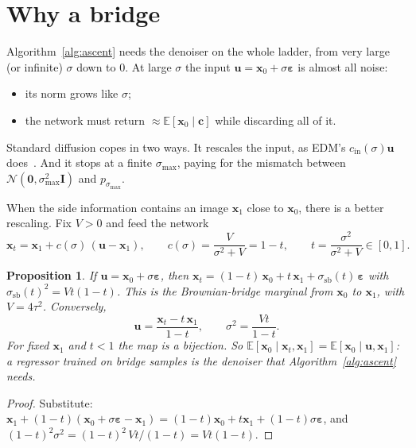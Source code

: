 \documentclass[11pt]{article}
\newtheorem{proposition}{Proposition}
\newcommand{\x}{\bm{x}}
\newcommand{\uu}{\bm{u}}
\newcommand{\cc}{\bm{c}}
\newcommand{\eps}{\bm{\varepsilon}}
\newcommand{\E}{\mathbb{E}}
\newcommand{\N}{\mathcal{N}}
\newcommand{\Id}{\bm{I}}
\newcommand{\ssb}{\sigma_{\mathrm{sb}}}
\begin{document}
\section{Why a bridge}\label{sec:bridge}

Algorithm~\ref{alg:ascent} needs the denoiser on the whole ladder, from very large (or infinite)
$\sigma$ down to $0$. At large $\sigma$ the input $\uu=\x_0+\sigma\eps$ is almost all noise:
\begin{itemize}[leftmargin=1.5em, itemsep=1pt]
  \item its norm grows like $\sigma$;
  \item the network must return $\approx\E[\x_0\mid\cc]$ while discarding all of it.
\end{itemize}
Standard diffusion copes in two ways. It rescales the input, as EDM's
$c_{\mathrm{in}}(\sigma)\uu$ does~\cite{karras2022}. And it stops at a finite $\sigma_{\max}$,
paying for the mismatch between $\N(\bm0,\sigma_{\max}^2\Id)$ and $p_{\sigma_{\max}}$.

When the side information contains an image $\x_1$ close to $\x_0$, there is a better
rescaling. Fix $V>0$ and feed the network
\begin{equation}
  \x_t = \x_1 + c(\sigma)\,(\uu-\x_1),\qquad c(\sigma) = \frac{V}{\sigma^2+V} = 1-t,
  \qquad t = \frac{\sigma^2}{\sigma^2+V}\in[0,1].
  \label{eq:x}
\end{equation}

\begin{proposition}\label{prop:bridge}
If $\uu=\x_0+\sigma\eps$, then $\x_t = (1-t)\,\x_0 + t\,\x_1 + \ssb(t)\,\eps$ with
$\ssb(t)^2 = Vt(1-t)$. This is the Brownian-bridge marginal from $\x_0$ to $\x_1$, with
$V=4\tau^2$. Conversely,
\begin{equation}
  \uu = \frac{\x_t - t\,\x_1}{1-t},\qquad \sigma^2 = \frac{Vt}{1-t}.
  \label{eq:u}
\end{equation}
For fixed $\x_1$ and $t<1$ the map is a bijection. So $\E[\x_0\mid\x_t,\x_1] =
\E[\x_0\mid\uu,\x_1]$: a regressor trained on bridge samples \emph{is} the denoiser that
Algorithm~\ref{alg:ascent} needs.
\end{proposition}
\begin{proof}
Substitute: $\x_1 + (1-t)(\x_0+\sigma\eps-\x_1) = (1-t)\x_0 + t\x_1 + (1-t)\sigma\eps$, and
$(1-t)^2\sigma^2 = (1-t)^2\,Vt/(1-t) = Vt(1-t)$.
\end{proof}
\end{document}
